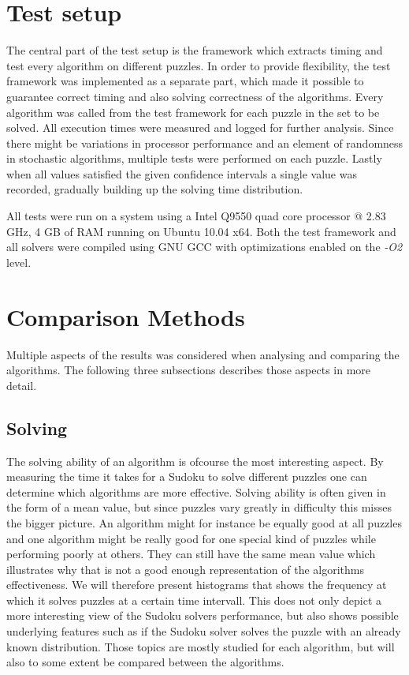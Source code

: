 \documentclass[a4paper,11pt]{kth-mag}
\begin{document}
\FloatBarrier
\section{Test setup}
The central part of the test setup is the framework which extracts timing and test every algorithm on different puzzles. 
In order to provide flexibility, the test framework was implemented as a separate part, which made it possible to guarantee correct timing and also solving correctness of the algorithms.
Every algorithm was called from the test framework for each puzzle in the set to be solved.
All execution times were measured and logged for further analysis.
Since there might be variations in processor performance and an element of randomness in stochastic algorithms, multiple tests were performed on each puzzle. 
Lastly when all values satisfied the given confidence intervals a single value was recorded, gradually building up the solving time distribution.

All tests were run on a system using a Intel Q9550 quad core processor @ 2.83 GHz, 4 GB of RAM running on Ubuntu 10.04 x64.
Both the test framework and all solvers were compiled using GNU GCC with optimizations enabled on the \emph{-O2} level.

\FloatBarrier
\section{Comparison Methods}
Multiple aspects of the results was considered when analysing and comparing the algorithms. The following three subsections describes those aspects in more detail. 

\FloatBarrier
\subsection{Solving}
The solving ability of an algorithm is ofcourse the most interesting aspect.
By measuring the time it takes for a Sudoku to solve different puzzles one
can determine which algorithms are more effective.
Solving ability is often given in the form of a mean value, but since puzzles vary greatly in difficulty this misses the bigger picture.
An algorithm might for instance be equally good at all puzzles and one algorithm might be really good for one special kind of puzzles while performing poorly at others.
They can still have the same mean value which illustrates why that is not a good enough representation of the algorithms effectiveness.
We will therefore present histograms that shows the frequency at which it solves puzzles at a certain time intervall.
This does not only depict a more interesting view of the Sudoku solvers performance, but also shows possible underlying features such as if the Sudoku solver solves the puzzle with an already known distribution.
Those topics are mostly studied for each algorithm, but will also to some extent be compared between the algorithms.
\end{document}
